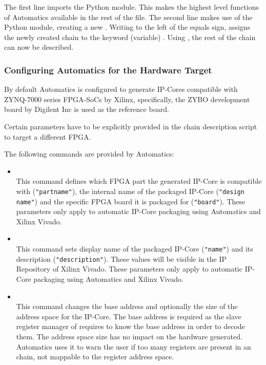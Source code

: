 The first line imports the  Python module.
This makes the highest level functions of Automatics available in the rest of the file.
The second line makes use of the  Python module, creating a new .
Writing  to the left of the equals sign, assigns the newly created chain to the keyword (variable) .
Using , the rest of the \asterics chain can now be described.

\subsubsection{Configuring Automatics for the Hardware Target}
\label{ssec:02-hwtargetconfig}

By default Automatics is configured to generate IP-Cores compatible with ZYNQ-7000 series FPGA-SoCs by Xilinx, specifically, the ZYBO development board by Digilent Inc is used as the reference board.

Certain parameters have to be explicitly provided in the chain description script to target a different FPGA.

The following commands are provided by Automatics:\\
\begin{itemize}
\item {}\\
This command defines which FPGA part the generated IP-Core is compatible with (\texttt{"partname"}), the internal name of the packaged IP-Core (\texttt{"design name"}) and the specific FPGA board it is packaged for (\texttt{"board"}).
These parameters only apply to automatic IP-Core packaging using Automatics and Xilinx Vivado.
\item {}\\
This command sets display name of the packaged IP-Core (\texttt{"name"}) and its description (\texttt{"description"}).
These values will be visible in the IP Repository of Xilinx Vivado.
These parameters only apply to automatic IP-Core packaging using Automatics and Xilinx Vivado.
\item {}\\
This command changes the base address and optionally the size of the address space for the \asterics IP-Core.
The base address is required as the slave register manager of \asterics requires to know the base address in order to decode them.
The address space size has no impact on the hardware generated.
Automatics uses it to warn the user if too many registers are present in an \asterics chain, not mappable to the register address space.
\end{itemize}

